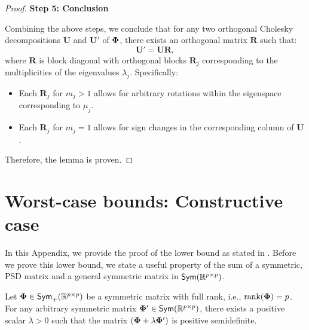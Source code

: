 \begin{proof}
\textbf{Step 5: Conclusion}

Combining the above steps, we conclude that for any two orthogonal Cholesky decompositions \( \mathbf{U} \) and \( \mathbf{U}' \) of \( \boldsymbol{\Phi} \), there exists an orthogonal matrix \( \mathbf{R} \) such that:
\[
    \mathbf{U}' = \mathbf{U} \mathbf{R},
\]
where \( \mathbf{R} \) is block diagonal with orthogonal blocks \( \mathbf{R}_j \) corresponding to the multiplicities of the eigenvalues \( \lambda_j \). Specifically:
\begin{itemize}
    \item Each \( \mathbf{R}_j \) for \( m_j > 1 \) allows for arbitrary rotations within the eigenspace corresponding to \( \mu_j \).
    \item Each \( \mathbf{R}_j \) for \( m_j = 1 \) allows for sign changes in the corresponding column of \( \mathbf{U} \).
\end{itemize}

Therefore, the lemma is proven.

\end{proof}
\fi


\section{Worst-case bounds: Constructive case}\label{app: worstcase}

In this Appendix, we provide the proof of the lower bound as stated in . Before we prove this lower bound, we state a useful property of the sum of a symmetric, PSD matrix and a general symmetric matrix in $\textsf{Sym}(\mathbb{R}^{p\times p})$.
\begin{lemma}\label{lem: sum}
    Let $\boldsymbol{\Phi} \in \textsf{Sym}_{+}(\mathbb{R}^{p\times p})$ be a symmetric matrix with full rank, i.e., $\text{rank}({\boldsymbol{\Phi}}) = p$. For any arbitrary symmetric matrix $\boldsymbol{\Phi}' \in \textsf{Sym}(\mathbb{R}^{p\times p})$, there exists a positive scalar $\lambda > 0$ such that the matrix $(\boldsymbol{\Phi} + \lambda \boldsymbol{\Phi}')$ is positive semidefinite.
\end{lemma}

